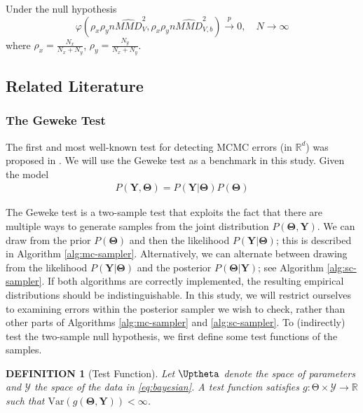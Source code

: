 \documentclass[a4paper,11pt]{article}
\newtheorem{definition}[theorem]{DEFINITION}
\newcommand{\var}{\mathrm{Var}}
\begin{document}
Under the null hypothesis
\begin{equation*}
    \varphi\left(\rho_{x} \rho_{y} n \widehat{MMD}_{V}^{2}, \rho_{x} \rho_{y} n \widehat{MMD}^{2}_{V, b}\right) \xrightarrow[]{p} 0, \quad N \rightarrow \infty
\end{equation*}
where $\rho_{x} = \frac{N_{x}}{N_{x} + N_{y}}$, $\rho_{y} = \frac{N_{y}}{N_{x} + N_{y}}$.

\subsection{Related Literature}
\subsubsection{The Geweke Test}
The first and most well-known test for detecting MCMC errors (in $\mathbb{R}^{d}$) was proposed in \cite{geweke_getting_2004}. We will use the Geweke test as a benchmark in this study. Given the model
\begin{align}
    P(\mathbf{Y}, \mathbf{\Theta}) = P(\mathbf{Y} | \mathbf{\Theta}) P(\mathbf{\Theta})
    \label{eq:bayesian}
\end{align}

The Geweke test is a two-sample test that exploits the fact that there are multiple ways to generate samples from the joint distribution $P(\mathbf{\Theta}, \mathbf{Y})$. We can draw from the prior $P(\mathbf{\Theta})$ and then the likelihood $P(\mathbf{Y}| \mathbf{\Theta})$; this is described in Algorithm \ref{alg:mc-sampler}. Alternatively, we can alternate between drawing from the likelihood $P(\mathbf{Y}| \mathbf{\Theta})$ and the posterior $P(\mathbf{\Theta}|\mathbf{Y})$; see Algorithm \ref{alg:sc-sampler}. If both algorithms are correctly implemented, the resulting empirical distributions should be indistinguishable. In this study, we will restrict ourselves to examining errors within the posterior sampler we wish to check, rather than other parts of Algorithms \ref{alg:mc-sampler} and \ref{alg:sc-sampler}. To (indirectly) test the two-sample null hypothesis, we first define some test functions of the samples.

\begin{definition}[Test Function]
    Let $\mathbf{\Uptheta}$ denote the space of parameters and $\mathcal{Y}$ the space of the data in \eqref{eq:bayesian}. A test function satisfies $g:\mathrm{\Theta} \times \mathcal{Y} \rightarrow \mathbb{R}$ such that $\var(g(\mathbf{\Theta}, \mathbf{Y})) < \infty$. 
\end{definition}
\end{document}
